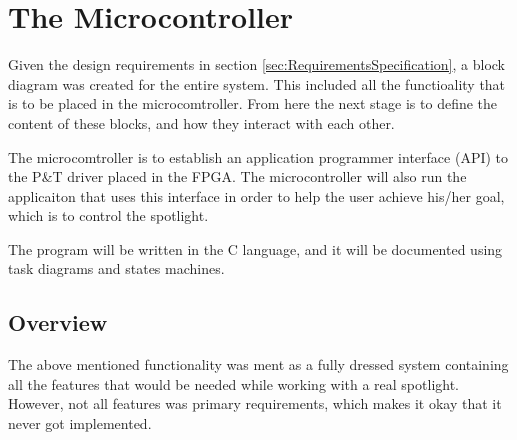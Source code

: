 




\section{The Microcontroller}
\label{sec:TheMicrocontroller}

 Given the design requirements in section \ref{sec:RequirementsSpecification}, a block diagram was created for the entire system. This included all the functioality that is to be placed in the microcomtroller. From here the next stage is to define the content of these blocks, and how they interact with each other. 
 
 The microcomtroller is to establish an application programmer interface (API) to the P\&T driver placed in the FPGA. The microcontroller will also run the applicaiton that uses this interface in order to help the user achieve his/her goal, which is to control the spotlight.
 
 The program will be written in the C language, and it will be documented using task diagrams and states machines. 




















\subsection{Overview}
The above mentioned functionality was ment as a fully dressed system containing all the features that would be needed while working with a real spotlight. However, not all features was primary requirements, which makes it okay that it never got implemented. 
 
